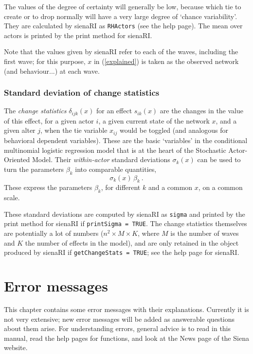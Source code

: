 \documentclass[a4paper,fleqn,11pt]{article}
\newcommand{\+}{\, + \,}
\newcommand{\sfn}[1]{\textsf{#1}}
\newcommand{\saom}{{Stochastic Actor-Oriented Model}}
\begin{document}
The values of the degree of certainty will generally be low, because
which tie to create or to drop normally will have a very large
degree of `chance variability'.
They are calculated by  \sfn{sienaRI} as \texttt{RHActors}
(see the help page). The mean over actors is printed by the print method
for \sfn{sienaRI}.

Note that the values given by \sfn{sienaRI} refer to each of the waves,
including the first wave; for this purpose, $x$ in (\ref{explained})
is taken as the observed network (and behaviour...) at each wave.


\subsubsection{Standard deviation of change statistics}

The  \emph{change statistics} $\delta_{ijk}(x)$
for an effect $s_{ik}(x)$ are the changes in the
value of this effect, for a given actor $i$, a given current state
of the network $x$, and a given alter $j$, when the
tie variable $x_{ij}$ would be toggled
(and analogous for behavioral dependent variables).
These are the basic `variables' in the conditional multinomial
logistic regression model that is at the heart of the \saom.
Their \emph{within-actor} standard deviations $\sigma_k(x)$
can be used to turn the parameters $\beta_k$ into
comparable quantities,
\begin{equation}
    \sigma_k(x) \, \beta_k  \ .   \label{standardized.beta}
\end{equation}
These express the parameters $\beta_k$, for different $k$ and a common $x$,
on a common scale.

These standard deviations are computed by \sfn{sienaRI} as \texttt{sigma}
and  printed by the print method for \sfn{sienaRI} if \texttt{printSigma = TRUE}.
The change statistics themselves are potentially a lot of numbers
($n^2 \times M \times K$, where $M$ is the number of waves and $K$
the number of effects in the model), and are only retained in the object
produced by \sfn{sienaRI} if \texttt{getChangeStats = TRUE};
see the help page for \sfn{sienaRI}.

\newpage
\section{Error messages}


This chapter contains some error messages with their explanations.
Currently it is not very  extensive; new error messages will be added
as answerable questions about them arise.
For understanding errors, general advice is to read in this manual,
read the help pages for functions, and look at the News page of the
Siena website.
\medskip
\end{document}

